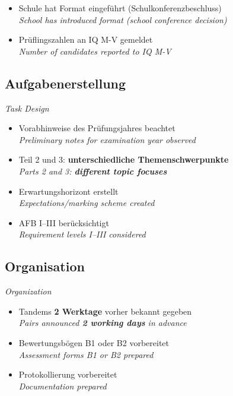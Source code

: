 \documentclass[11pt,a4paper]{article}
\newcommand{\bisubsection}[2]{%
    \subsection{#1}%
    {\small\color{englishgray}\textit{#2}}\par\vspace{4pt}%
}
\begin{document}
\begin{itemize}[label=$\square$]
\item Schule hat Format eingeführt (Schulkonferenzbeschluss)\\ {\color{englishgray}\textit{School has introduced format (school conference decision)}}
\item Prüflingszahlen an IQ M-V gemeldet\\ {\color{englishgray}\textit{Number of candidates reported to IQ M-V}}
\end{itemize}

\bisubsection{Aufgabenerstellung}{Task Design}

\begin{itemize}[label=$\square$]
\item Vorabhinweise des Prüfungsjahres beachtet\\ {\color{englishgray}\textit{Preliminary notes for examination year observed}}
\item Teil 2 und 3: \textbf{unterschiedliche Themenschwerpunkte}\\ {\color{englishgray}\textit{Parts 2 and 3: \textbf{different topic focuses}}}
\item Erwartungshorizont erstellt\\ {\color{englishgray}\textit{Expectations/marking scheme created}}
\item AFB I--III berücksichtigt\\ {\color{englishgray}\textit{Requirement levels I--III considered}}
\end{itemize}

\bisubsection{Organisation}{Organization}

\begin{itemize}[label=$\square$]
\item Tandems \textbf{2 Werktage} vorher bekannt gegeben\\ {\color{englishgray}\textit{Pairs announced \textbf{2 working days} in advance}}
\item Bewertungsbögen B1 oder B2 vorbereitet\\ {\color{englishgray}\textit{Assessment forms B1 or B2 prepared}}
\item Protokollierung vorbereitet\\ {\color{englishgray}\textit{Documentation prepared}}
\end{itemize}

\newpage
\end{document}
